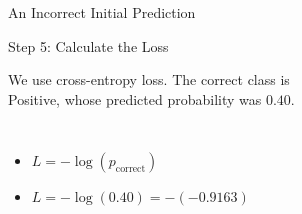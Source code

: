 \documentclass[aspectratio=169,10pt]{beamer}
\begin{document}
\begin{frame}{An Incorrect Initial Prediction}
  \vfill
  \centering
  \resizebox{0.55\textwidth}{!}{\ptwexforward}
  \vfill
\end{frame}

\begin{frame}{Step 5: Calculate the Loss}
  \small

  {\raggedright
  We use cross-entropy loss. The correct class is \\Positive,
  whose predicted probability was $0.40$.\par}

  \vskip0.3cm

  \begin{columns}[T]

      \small

      \begin{itemize}\itemsep6pt

        \item \small
        $L = -\log(p_{\text{correct}})$

        \item \small
        $L = -\log(0.40) = -(-0.9163)$


      \end{itemize}

      \centering

      \vspace{-0.9cm}%

      \resizebox{0.6\linewidth}{!}{\ptwexloss}

  \end{columns}

\end{frame}
\end{document}
